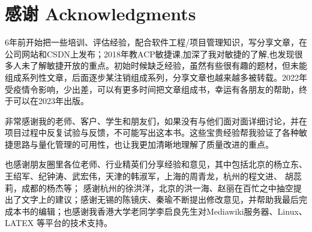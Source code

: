 \chapter*{感谢 Acknowledgments } %

6年前开始把一些培训、评估经验，配合软件工程/项目管理知识，写分享文章，在公司网站和CSDN上发布；2018年教ACP敏捷课,加深了我对敏捷的了解,也发现很多人未了解敏捷开放的重点。初始时候缺乏经验，虽然有些很有趣的题材，但未能组成系列性文章，后面逐步某注销组成系列，分享文章也越来越多被转载。2022年受疫情令影响，少出差，可以有更多时间把文章组成书，幸运有各朋友的帮助，终于可以在2023年出版。

非常感谢我的老师、客户、学生和朋友们，如果没有与他们面对面详细讨论，并在项目过程中反复试验与反馈，不可能写出这本书。这些宝贵经验帮我验证了各种敏捷思路与量化管理的可用性，也让我更加清晰地理解了质量改进的重点。

也感谢朋友圈里各位老师、行业精英们分享经验和意见，其中包括北京的杨立东、王绍军、纪钟涛、武宏伟，天津的韩淑军，上海的周青龙，杭州的程文进、 胡蕊莉，成都的杨杰等； 感谢杭州的徐洪洋，北京的洪一海、赵丽在百忙之中抽空提出了文字上的建议；感谢无锡的陈镜庆、秦瑜不断提出修改意见，并帮助我最后完成本书的编辑；也感谢我香港大学老同学李启良先生对Mediawiki服务器、Linux、LATEX 等平台的技术支持。 